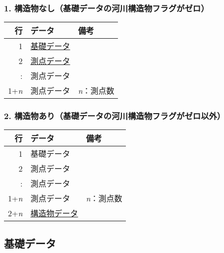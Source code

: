 \documentclass{jsarticle}
\begin{document}
\hypertarget{ux69cbux9020ux7269ux306aux3057ux57faux790eux30c7ux30fcux30bfux306eux6cb3ux5dddux69cbux9020ux7269ux30d5ux30e9ux30b0ux304cux30bcux30ed}{%
\subsubsection{1.
構造物なし（基礎データの河川構造物フラグがゼロ）}\label{ux69cbux9020ux7269ux306aux3057ux57faux790eux30c7ux30fcux30bfux306eux6cb3ux5dddux69cbux9020ux7269ux30d5ux30e9ux30b0ux304cux30bcux30ed}}

\begin{longtable}[]{@{}rll@{}}
\toprule
行 & データ & 備考\tabularnewline
\midrule
\endhead
1 & \protect\hyperlink{ux57faux790eux30c7ux30fcux30bf}{基礎データ}
&\tabularnewline
2 & \protect\hyperlink{ux6e2cux70b9ux30c7ux30fcux30bf}{測点データ}
&\tabularnewline
: & 測点データ &\tabularnewline
1+\emph{n} & 測点データ & \emph{n}：測点数\tabularnewline
\bottomrule
\end{longtable}

\hypertarget{ux69cbux9020ux7269ux3042ux308aux57faux790eux30c7ux30fcux30bfux306eux6cb3ux5dddux69cbux9020ux7269ux30d5ux30e9ux30b0ux304cux30bcux30edux4ee5ux5916}{%
\subsubsection{2.
構造物あり（基礎データの河川構造物フラグがゼロ以外）}\label{ux69cbux9020ux7269ux3042ux308aux57faux790eux30c7ux30fcux30bfux306eux6cb3ux5dddux69cbux9020ux7269ux30d5ux30e9ux30b0ux304cux30bcux30edux4ee5ux5916}}

\begin{longtable}[]{@{}rll@{}}
\toprule
行 & データ & 備考\tabularnewline
\midrule
\endhead
1 & 基礎データ &\tabularnewline
2 & 測点データ &\tabularnewline
: & 測点データ &\tabularnewline
1+\emph{n} & 測点データ & \emph{n}：測点数\tabularnewline
2+\emph{n} &
\protect\hyperlink{ux69cbux9020ux7269ux30c7ux30fcux30bf}{構造物データ}
&\tabularnewline
\bottomrule
\end{longtable}

\hypertarget{ux57faux790eux30c7ux30fcux30bf}{%
\subsection{基礎データ}\label{ux57faux790eux30c7ux30fcux30bf}}
\end{document}
